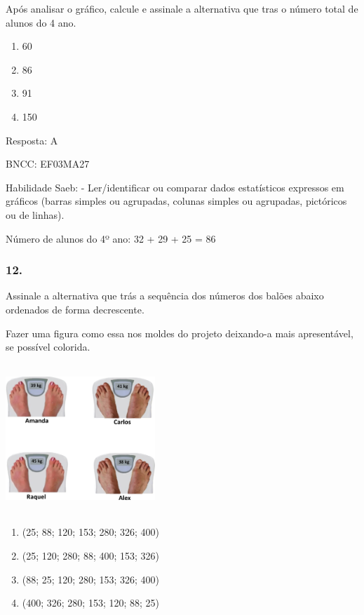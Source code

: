 Após analisar o gráfico, calcule e assinale a alternativa que tras o
número total de alunos do 4 ano.

\begin{enumerate}
\def\labelenumi{\alph{enumi})}
\item
  60
\item
  86
\item
  91
\item
  150
\end{enumerate}

Resposta: A

BNCC: EF03MA27

Habilidade Saeb: - Ler/identificar ou comparar dados estatísticos
expressos em gráficos (barras simples ou agrupadas, colunas simples ou
agrupadas, pictóricos ou de linhas).

Número de alunos do 4º ano: 32 + 29 + 25 = 86

\subsubsection{12.}\label{section-137}

Assinale a alternativa que trás a sequência dos números dos balões
abaixo ordenados de forma decrescente.

Fazer uma figura como essa nos moldes do projeto deixando-a mais
apresentável, se possível colorida.

\includegraphics[width=2.21686in,height=2.20852in]{media/image113.png}

\begin{enumerate}
\def\labelenumi{\alph{enumi})}
\item
  (25; 88; 120; 153; 280; 326; 400)
\item
  (25; 120; 280; 88; 400; 153; 326)
\item
  (88; 25; 120; 280; 153; 326; 400)
\item
  (400; 326; 280; 153; 120; 88; 25)
\end{enumerate}

